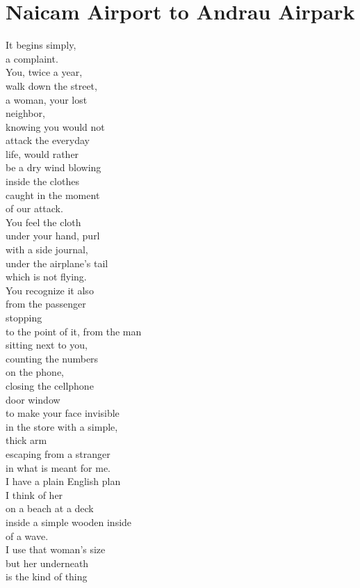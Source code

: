 \documentclass[smalldemyvopaper,11pt,twoside,onecolumn,openright,extrafontsizes]{memoir}
\begin{document}
\chapter{Naicam Airport to Andrau Airpark}
It begins simply,
\\a complaint.
\\You, twice a year,
\\walk down the street,
\\a woman, your lost
\\neighbor,
\\knowing you would not
\\attack the everyday
\\life, would rather
\\be a dry wind blowing
\\inside the clothes
\\caught in the moment
\\of our attack.
\\You feel the cloth
\\under your hand, purl
\\with a side journal,
\\under the airplane's tail
\\which is not flying.
\\You recognize it also
\\from the passenger
\\stopping
\\to the point of it, from the man
\\sitting next to you,
\\counting the numbers
\\on the phone,
\\closing the cellphone
\\door window
\\to make your face invisible
\\in the store with a simple,
\\thick arm
\\escaping from a stranger
\\in what is meant for me.
\\I have a plain English plan
\\I think of her
\\on a beach at a deck
\\inside a simple wooden inside
\\of a wave.
\\I use that woman's size
\\but her underneath
\\is the kind of thing
\end{document}
